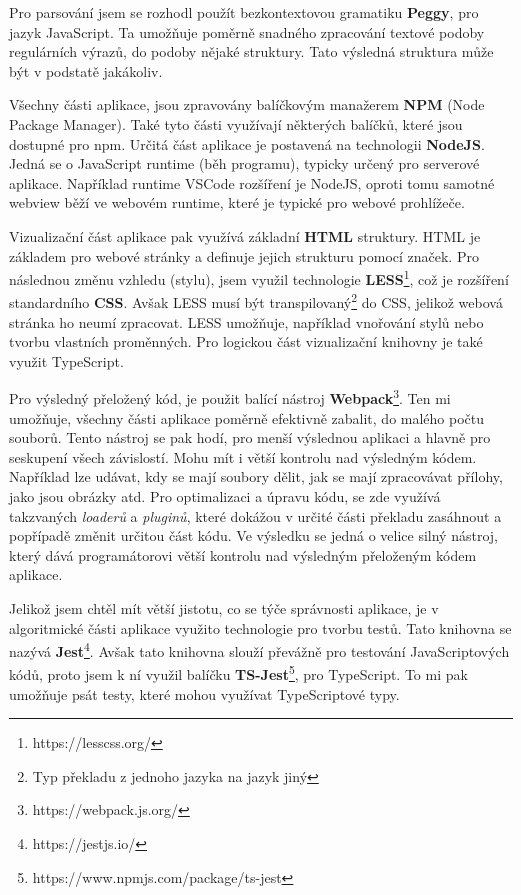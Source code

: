 Pro parsování jsem se rozhodl použít bezkontextovou gramatiku \textbf{Peggy}\cite{Peggy, Peggyjs}, pro jazyk JavaScript.
Ta umožňuje poměrně snadného zpracování textové podoby regulárních výrazů, do podoby nějaké struktury.
Tato výsledná struktura může být v podstatě jakákoliv.

Všechny části aplikace, jsou zpravovány balíčkovým manažerem \textbf{NPM} (Node Package Manager).
Také tyto části využívají některých balíčků, které jsou dostupné pro npm. 
Určitá část aplikace je postavená na technologii \textbf{NodeJS}.
Jedná se o JavaScript runtime (běh programu), typicky určený pro serverové aplikace. 
Například runtime VSCode rozšíření je NodeJS, oproti tomu samotné webview běží ve webovém runtime, které je typické pro webové prohlížeče.

Vizualizační část aplikace pak využívá základní \textbf{HTML} struktury.  
HTML je základem pro webové stránky a definuje jejich strukturu pomocí značek.
Pro následnou změnu vzhledu (stylu), jsem využil technologie \textbf{LESS}\footnote{https://lesscss.org/}, což je rozšíření standardního \textbf{CSS}.
Avšak LESS musí být transpilovaný\footnote{Typ překladu z jednoho jazyka na jazyk jiný} do CSS, jelikož webová stránka ho neumí zpracovat. 
LESS umožňuje, například vnořování stylů nebo tvorbu vlastních proměnných.
Pro logickou část vizualizační knihovny je také využit TypeScript.

Pro výsledný přeložený kód, je použit balící nástroj \textbf{Webpack}\footnote{https://webpack.js.org/}.
Ten mi umožňuje, všechny části aplikace poměrně efektivně zabalit, do malého počtu souborů. 
Tento nástroj se pak hodí, pro menší výslednou aplikaci a hlavně pro seskupení všech závislostí.
Mohu mít i větší kontrolu nad výsledným kódem.
Například lze udávat, kdy se mají soubory dělit, jak se mají zpracovávat přílohy, jako jsou obrázky atd.
Pro optimalizaci a úpravu kódu, se zde využívá takzvaných \textit{loaderů} a \textit{pluginů}, 
které dokážou v určité části překladu zasáhnout a popřípadě změnit určitou část kódu.
Ve výsledku se jedná o velice silný nástroj, který dává programátorovi větší kontrolu nad výsledným přeloženým kódem aplikace.

Jelikož jsem chtěl mít větší jistotu, co se týče správnosti aplikace, je v algoritmické části aplikace využito technologie pro tvorbu testů. 
Tato knihovna se nazývá \textbf{Jest}\footnote{https://jestjs.io/}.
Avšak tato knihovna slouží převážně pro testování JavaScriptových kódů, proto jsem k ní využil balíčku \textbf{TS-Jest}\footnote{https://www.npmjs.com/package/ts-jest}, pro TypeScript.
To mi pak umožňuje psát testy, které mohou využívat TypeScriptové typy.

